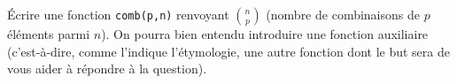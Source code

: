 \exer{}
\setcounter{numques}{0}

\question {}

Écrire une fonction \texttt{comb(p,n)} renvoyant 
  $\binom{n}{p}$ (nombre de combinaisons de $p$ éléments parmi
  $n$). On pourra bien entendu introduire une fonction 
  auxiliaire (c'est-à-dire, comme l'indique l'étymologie, une
 autre fonction dont le but sera de vous aider à répondre à la question).